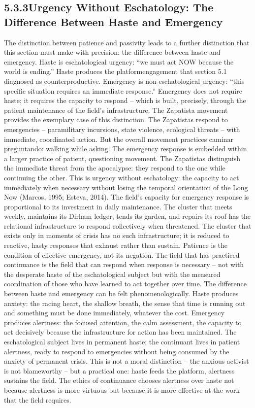 \subsection{5.3.3\quad Urgency Without Eschatology: The Difference Between Haste and Emergency}

The distinction between patience and passivity leads to a further distinction that this section must make with precision: the difference between haste and emergency. Haste is eschatological urgency: “we must act NOW because the world is ending.” Haste produces the platformengagement that section 5.1 diagnosed as counterproductive. Emergency is non-eschatological urgency: “this specific situation requires an immediate response.” Emergency does not require haste; it requires the capacity to respond – which is built, precisely, through the patient maintenance of the field’s infrastructure. The Zapatista movement provides the exemplary case of this distinction. The Zapatistas respond to emergencies – paramilitary incursions, state violence, ecological threats – with immediate, coordinated action. But the overall movement practices caminar preguntando: walking while asking. The emergency response is embedded within a larger practice of patient, questioning movement. The Zapatistas distinguish the immediate threat from the apocalypse: they respond to the one while continuing the other. This is urgency without eschatology: the capacity to act immediately when necessary without losing the temporal orientation of the Long Now (Marcos, 1995; Esteva, 2014). The field’s capacity for emergency response is proportional to its investment in daily maintenance. The cluster that meets weekly, maintains its Dirham ledger, tends its garden, and repairs its roof has the relational infrastructure to respond collectively when threatened. The cluster that exists only in moments of crisis has no such infrastructure; it is reduced to reactive, hasty responses that exhaust rather than sustain. Patience is the condition of effective emergency, not its negation. The field that has practiced continuance is the field that can respond when response is necessary – not with the desperate haste of the eschatological subject but with the measured coordination of those who have learned to act together over time. The difference between haste and emergency can be felt phenomenologically. Haste produces anxiety: the racing heart, the shallow breath, the sense that time is running out and something must be done immediately, whatever the cost. Emergency produces alertness: the focused attention, the calm assessment, the capacity to act decisively because the infrastructure for action has been maintained. The eschatological subject lives in permanent haste; the continuant lives in patient alertness, ready to respond to emergencies without being consumed by the anxiety of permanent crisis. This is not a moral distinction – the anxious activist is not blameworthy – but a practical one: haste feeds the platform, alertness sustains the field. The ethics of continuance chooses alertness over haste not because alertness is more virtuous but because it is more effective at the work that the field requires.

